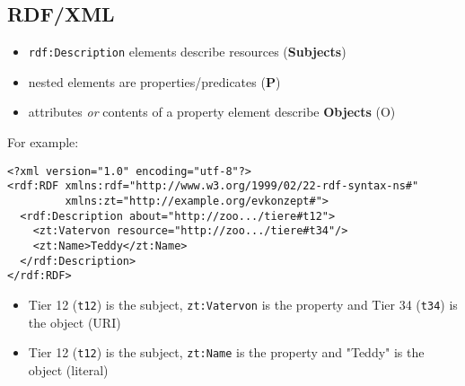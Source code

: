 \documentclass[11pt]{article}
\begin{document}
\subsection{RDF/XML}
\label{sec:orge026092}
\begin{itemize}
\item \texttt{rdf:Description} elements describe resources (\textbf{Subjects})
\item nested elements are properties/predicates (\textbf{P})
\item attributes \emph{or} contents of a property element describe \textbf{Objects} (O)
\end{itemize}
For example:
\lstset{breaklines=true,language=XML,label= ,caption= ,captionpos=b,numbers=none}
\begin{lstlisting}
<?xml version="1.0" encoding="utf-8"?>
<rdf:RDF xmlns:rdf="http://www.w3.org/1999/02/22-rdf-syntax-ns#"
         xmlns:zt="http://example.org/evkonzept#">
  <rdf:Description about="http://zoo.../tiere#t12">
    <zt:Vatervon resource="http://zoo.../tiere#t34"/>
    <zt:Name>Teddy</zt:Name>
  </rdf:Description>
</rdf:RDF>
\end{lstlisting}
\begin{itemize}
\item Tier 12 (\texttt{t12}) is the subject, \texttt{zt:Vatervon} is the property and Tier 34 (\texttt{t34}) is the object (URI)
\item Tier 12 (\texttt{t12}) is the subject, \texttt{zt:Name} is the property and "Teddy" is the object (literal)
\end{itemize}
\end{document}
